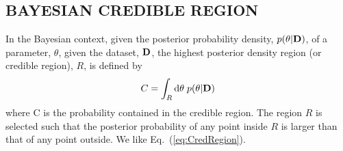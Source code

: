 \begin{appendices}

\section{BAYESIAN CREDIBLE REGION}
\label{sec:CredRegion}

In the Bayesian context, given the posterior probability density,
$p(\theta|{\bf D})$, of a parameter, $\theta$, given the dataset,
${\bf D}$, the highest posterior density region (or credible
region), $R$, is defined by
\begin{equation}
C = \int\sb{R} {\rm d}\theta\;p(\theta|{\bf D})
\label{eq:CredRegion}
\end{equation}
where C is the probability contained in the credible region.  The
region $R$ is selected such that the posterior probability of any
point inside $R$ is larger than that of any point outside.  We like
Eq.\ (\ref{eq:CredRegion}).

\end{appendices}


